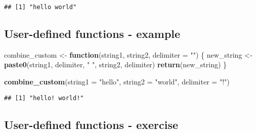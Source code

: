 \documentclass[]{article}
\newenvironment{Shaded}{\begin{snugshade}}{\end{snugshade}}
\newcommand{\KeywordTok}[1]{\textcolor[rgb]{0.13,0.29,0.53}{\textbf{#1}}}
\newcommand{\DataTypeTok}[1]{\textcolor[rgb]{0.13,0.29,0.53}{#1}}
\newcommand{\StringTok}[1]{\textcolor[rgb]{0.31,0.60,0.02}{#1}}
\newcommand{\ControlFlowTok}[1]{\textcolor[rgb]{0.13,0.29,0.53}{\textbf{#1}}}
\newcommand{\NormalTok}[1]{#1}
\begin{document}
\begin{verbatim}
## [1] "hello world"
\end{verbatim}

\subsection{User-defined functions -
example}\label{user-defined-functions---example-2}

\begin{Shaded}
\begin{Highlighting}[]
\NormalTok{combine_custom <-}\StringTok{ }\ControlFlowTok{function}\NormalTok{(string1, string2, }\DataTypeTok{delimiter =} \StringTok{""}\NormalTok{) \{}
\NormalTok{  new_string <-}\StringTok{ }\KeywordTok{paste0}\NormalTok{(string1, delimiter, }\StringTok{" "}\NormalTok{, string2, delimiter)}
  \KeywordTok{return}\NormalTok{(new_string)}
\NormalTok{\}}


\KeywordTok{combine_custom}\NormalTok{(}\DataTypeTok{string1 =} \StringTok{"hello"}\NormalTok{, }\DataTypeTok{string2 =} \StringTok{"world"}\NormalTok{, }\DataTypeTok{delimiter =} \StringTok{"!"}\NormalTok{)}
\end{Highlighting}
\end{Shaded}

\begin{verbatim}
## [1] "hello! world!"
\end{verbatim}

\subsection{User-defined functions -
exercise}\label{user-defined-functions---exercise}
\end{document}

